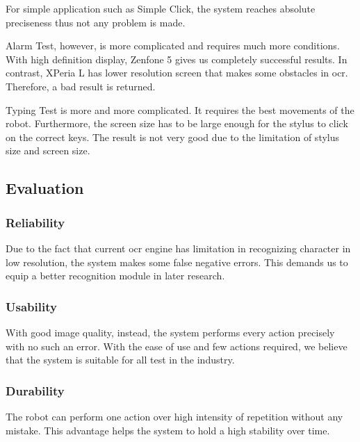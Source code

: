 For simple application such as Simple Click, the system reaches absolute preciseness thus not any problem is made.

Alarm Test, however, is more complicated and requires much more conditions. With high definition display, Zenfone 5 gives us completely successful results. In contrast, XPeria L has lower resolution screen that makes some obstacles in \acrshort{ocr}. Therefore, a bad result is returned.

Typing Test is more and more complicated. It requires the best movements of the robot. Furthermore, the screen size has to be large enough for the stylus to click on the correct keys. The result is not very good due to the limitation of stylus size and screen size.

\subsection{Evaluation}
\subsubsection{Reliability}
Due to the fact that current \acrshort{ocr} engine has limitation in recognizing character in low resolution, the system makes some false negative errors. This demands us to equip a better recognition module in later research.

\subsubsection{Usability}
With good image quality, instead, the system performs every action precisely with no such an error. With the ease of use and few actions required, we believe that the system is suitable for all test in the industry.

\subsubsection{Durability}
The robot can perform one action over high intensity of repetition without any mistake. This advantage helps the system to hold a high stability over time.
